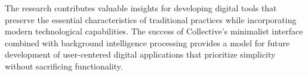 \documentclass[conference]{IEEEtran}
\begin{document}
The research contributes valuable insights for developing digital tools that preserve the essential characteristics of traditional practices while incorporating modern technological capabilities. The success of Collective's minimalist interface combined with background intelligence processing provides a model for future development of user-centered digital applications that prioritize simplicity without sacrificing functionality.


 






\end{document}
